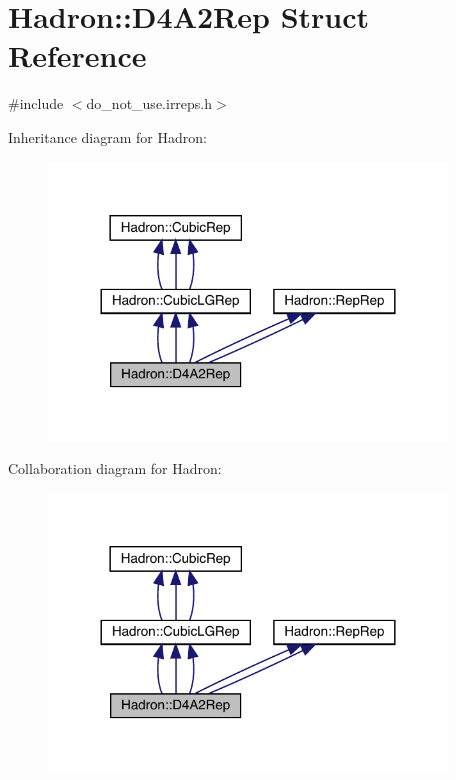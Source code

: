 \hypertarget{structHadron_1_1D4A2Rep}{}\section{Hadron\+:\+:D4\+A2\+Rep Struct Reference}
\label{structHadron_1_1D4A2Rep}


{\ttfamily \#include $<$do\+\_\+not\+\_\+use.\+irreps.\+h$>$}



Inheritance diagram for Hadron\+:
\nopagebreak
\begin{figure}[H]
\begin{center}
\leavevmode
\includegraphics[width=300pt]{dd/d4b/structHadron_1_1D4A2Rep__inherit__graph}
\end{center}
\end{figure}


Collaboration diagram for Hadron\+:
\nopagebreak
\begin{figure}[H]
\begin{center}
\leavevmode
\includegraphics[width=300pt]{dd/d01/structHadron_1_1D4A2Rep__coll__graph}
\end{center}
\end{figure}
